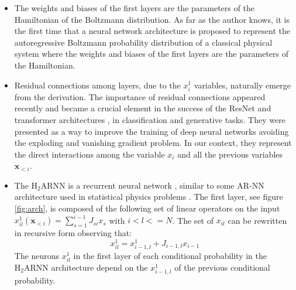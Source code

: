 \documentclass[aps,physrev,10pt,floatfix,reprint]{revtex4-2}
\begin{document}
\begin{itemize}
    \item The weights and biases of the first layers are the parameters of the Hamiltonian of the Boltzmann distribution.  As far as the author knows, it is the first time that a neural network architecture is proposed to represent the autoregressive Boltzmann probability distribution of a classical physical system where the weights and biases of the first layers are the parameters of the Hamiltonian. 
    \item Residual connections among layers, due to the $x_i^1$ variables, naturally emerge from the derivation. 
    The importance of residual connections appeared recently \cite{10.48550/arxiv.1512.03385} and became a crucial element in the success of the ResNet and transformer architectures \cite{vaswani2017attention}, in classification and generative tasks. They were presented as a way to improve the training of deep neural networks avoiding the exploding and vanishing gradient problem. In our context, they represent the direct interactions among the variable $x_i$ and all the previous variables $\mathbf{x}_{<i}$. 

    \item The $\text{H}_2\text{ARNN}$ is a recurrent neural network \cite{bengioNatureDeepLearning2015, https://doi.org/10.48550/arxiv.1506.00019}, similar to some AR-NN architecture used in statistical physics problems \cite{10.1038/s42256-021-00401-3, PhysRevResearch.2.023358}. 
    The first layer, see figure \ref{fig:arch}, is composed of the following set of linear operators on the input $x^1_{il}(\mathbf{x}_{<i})=\sum_{s=1}^{i-1} J_{si} x_s$ with $i<l<=N$. The set of $x_{il}$ can be rewritten in recursive form observing that:
    \begin{equation}
        x^1_{il} = x^1_{i-1,l} + J_{i-1,l} x_{i-1}
    \end{equation}
    The neurons $x^1_{il}$ in the first layer of each conditional probability in the $\text{H}_2\text{ARNN}$ architecture depend on the $x^1_{i-1,l}$ of the previous conditional probability.
\end{itemize}
\end{document}
